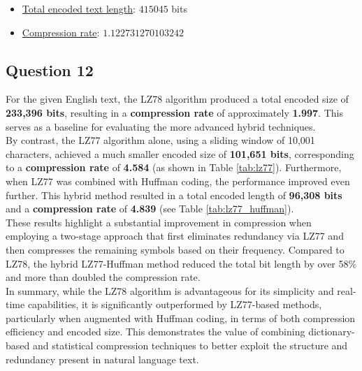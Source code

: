 \documentclass[]{template}
\begin{document}
    \begin{itemize}
        \item \underline{Total encoded text length}: $415045$ bits
        \item \underline{Compression rate}: $1.122731270103242$
    \end{itemize}

    \subsection{Question 12}

    For the given English text, the LZ78 algorithm produced a total encoded size of \textbf{233,396 bits}, 
    resulting in a \textbf{compression rate} of approximately \textbf{1.997}. 
    This serves as a baseline for evaluating the more advanced hybrid techniques.\\

    \noindent
    By contrast, the LZ77 algorithm alone, using a sliding window of 10,001 characters, 
    achieved a much smaller encoded size of \textbf{101,651 bits}, corresponding to a \textbf{compression rate} of \textbf{4.584} (as shown in Table \ref{tab:lz77}). 
    Furthermore, when LZ77 was combined with Huffman coding, the performance improved even further.
    This hybrid method resulted in a total encoded length of \textbf{96,308 bits} and a \textbf{compression rate} of \textbf{4.839} (see Table \ref{tab:lz77_huffman}).\\

    \noindent
    These results highlight a substantial improvement in compression when employing a two-stage approach 
    that first eliminates redundancy via LZ77 and then compresses the remaining symbols based on their frequency. 
    Compared to LZ78, the hybrid LZ77-Huffman method reduced the total bit length by over 58\% and more than doubled the compression rate.\\

    \noindent
    In summary, while the LZ78 algorithm is advantageous for its simplicity and real-time capabilities, 
    it is significantly outperformed by LZ77-based methods, particularly when augmented with Huffman coding, 
    in terms of both compression efficiency and encoded size. This demonstrates the value of combining 
    dictionary-based and statistical compression techniques to better exploit the structure and redundancy 
    present in natural language text.
\end{document}
